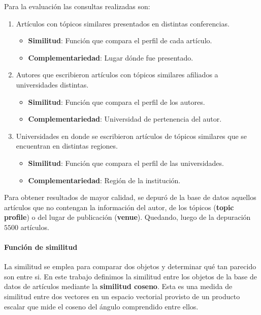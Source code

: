 Para la evaluación las consultas realizadas son:
\begin{enumerate}
	\item
		Artículos con tópicos similares presentados en distintas conferencias. \label{busqueda:articulos}
		\begin{itemize}
			\item \textbf{Similitud}: Función que compara el perfil de cada artículo.
			\item \textbf{Complementariedad}: Lugar dónde fue presentado.
		\end{itemize}

	\item
	Autores que escribieron artículos con tópicos similares afiliados a universidades distintas. \label{busqueda:autores}
	\begin{itemize}
		\item \textbf{Similitud}: Función que compara el perfil de los autores.
		\item \textbf{Complementariedad}: Universidad de pertenencia del autor.
	\end{itemize}

	\item 
	Universidades en donde se escribieron artículos de tópicos similares que se encuentran en distintas regiones. \label{busqueda:universidades}
	\begin{itemize}
		\item \textbf{Similitud}: Función que compara el perfil de las universidades.
		\item \textbf{Complementariedad}: Región de la institución.
	\end{itemize}
\end {enumerate}

Para obtener resultados de mayor calidad, se depuró de la base de datos aquellos artículos que no contengan la información del autor, de los tópicos (\textbf{topic profile}) o del lugar de publicación (\textbf{venue}). Quedando, luego de la depuración $5500$ artículos.  

\paragraph{Función de similitud}
La similitud se emplea para comparar dos objetos y determinar qué tan parecido son entre si. En este trabajo definimos la similitud entre los objetos de la base de datos de artículos mediante la \textbf{similitud coseno}. Esta es una medida de similitud entre dos vectores en un espacio vectorial provisto de un producto escalar que mide el coseno del ángulo comprendido entre ellos.

